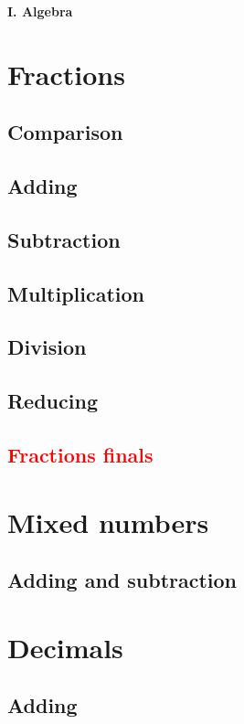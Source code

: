 \documentclass[a4paper]{article}
\begin{document}
	

	\begin{multicols}{2}

		{\huge \textbf{I. Algebra}}
		
		{\Large \section {Fractions}}

		\subsection{Comparison}
		\subsection{Adding}
		\subsection{Subtraction}
		\subsection{Multiplication}
		\subsection{Division}
		\subsection{Reducing}
		\subsection{\textcolor{red}{Fractions finals}}
	
		{\Large \section {Mixed numbers}}
	
		\subsection{Adding and subtraction}
	
		{\Large \section {Decimals}}
		
		\subsection{Adding}

\end{multicols}
\end{document}
